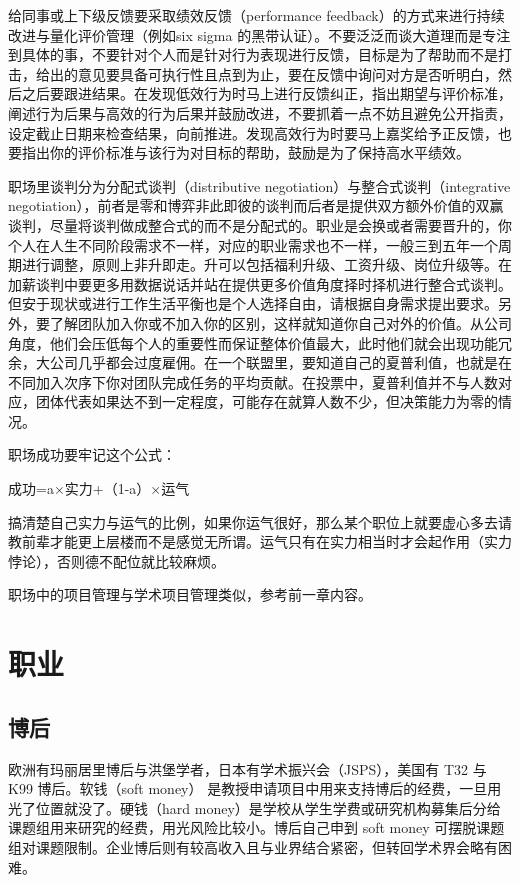 \documentclass[]{tufte-book}
\begin{document}
给同事或上下级反馈要采取绩效反馈（performance feedback）的方式来进行持续改进与量化评价管理（例如six sigma 的黑带认证）。不要泛泛而谈大道理而是专注到具体的事，不要针对个人而是针对行为表现进行反馈，目标是为了帮助而不是打击，给出的意见要具备可执行性且点到为止，要在反馈中询问对方是否听明白，然后之后要跟进结果。在发现低效行为时马上进行反馈纠正，指出期望与评价标准，阐述行为后果与高效的行为后果并鼓励改进，不要抓着一点不妨且避免公开指责，设定截止日期来检查结果，向前推进。发现高效行为时要马上嘉奖给予正反馈，也要指出你的评价标准与该行为对目标的帮助，鼓励是为了保持高水平绩效。

职场里谈判分为分配式谈判（distributive negotiation）与整合式谈判（integrative negotiation），前者是零和博弈非此即彼的谈判而后者是提供双方额外价值的双赢谈判，尽量将谈判做成整合式的而不是分配式的。职业是会换或者需要晋升的，你个人在人生不同阶段需求不一样，对应的职业需求也不一样，一般三到五年一个周期进行调整，原则上非升即走。升可以包括福利升级、工资升级、岗位升级等。在加薪谈判中要更多用数据说话并站在提供更多价值角度择时择机进行整合式谈判。但安于现状或进行工作生活平衡也是个人选择自由，请根据自身需求提出要求。另外，要了解团队加入你或不加入你的区别，这样就知道你自己对外的价值。从公司角度，他们会压低每个人的重要性而保证整体价值最大，此时他们就会出现功能冗余，大公司几乎都会过度雇佣。在一个联盟里，要知道自己的夏普利值，也就是在不同加入次序下你对团队完成任务的平均贡献。在投票中，夏普利值并不与人数对应，团体代表如果达不到一定程度，可能存在就算人数不少，但决策能力为零的情况。

职场成功要牢记这个公式：

成功=a×实力+（1-a）×运气

搞清楚自己实力与运气的比例，如果你运气很好，那么某个职位上就要虚心多去请教前辈才能更上层楼而不是感觉无所谓。运气只有在实力相当时才会起作用（实力悖论），否则德不配位就比较麻烦。

职场中的项目管理与学术项目管理类似，参考前一章内容。

\hypertarget{ux804cux4e1a}{%
\section{职业}\label{ux804cux4e1a}}

\hypertarget{ux535aux540e}{%
\subsection{博后}\label{ux535aux540e}}

欧洲有玛丽居里博后与洪堡学者，日本有学术振兴会（JSPS），美国有 T32 与 K99 博后。软钱（soft money） 是教授申请项目中用来支持博后的经费，一旦用光了位置就没了。硬钱（hard money）是学校从学生学费或研究机构募集后分给课题组用来研究的经费，用光风险比较小。博后自己申到 soft money 可摆脱课题组对课题限制。企业博后则有较高收入且与业界结合紧密，但转回学术界会略有困难。
\end{document}
